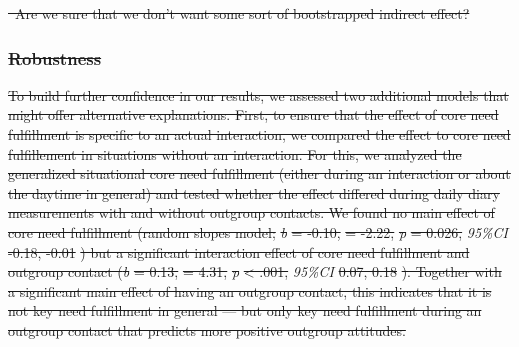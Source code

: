 \documentclass[man, 12pt, a4paper, mask]{apa7} %
\theoremstyle{break}
\theoremstyle{plain}
\providecommand{\DIFdeltex}[1]{{\protect\color{red}\sout{#1}}}                      %
\providecommand{\DIFdelbegin}{} %
\providecommand{\DIFdel}[1]{\texorpdfstring{\DIFdeltex{#1}}{}} %
\newcommand{\DIFscaledelfig}{0.5}
\newlength{\DIFdelgraphicswidth} %
\newlength{\DIFdelgraphicsheight} %
\newcommand{\DIFdelincludegraphics}[2][]{%
\sbox{\DIFdelgraphicsbox}{\DIFOincludegraphics[#1]{#2}}%
\settoboxwidth{\DIFdelgraphicswidth}{\DIFdelgraphicsbox} %
\settoboxtotalheight{\DIFdelgraphicsheight}{\DIFdelgraphicsbox} %
\scalebox{\DIFscaledelfig}{%
\parbox[b]{\DIFdelgraphicswidth}{\usebox{\DIFdelgraphicsbox}\\[-\baselineskip] \rule{\DIFdelgraphicswidth}{0em}}\llap{\resizebox{\DIFdelgraphicswidth}{\DIFdelgraphicsheight}{%
\setlength{\unitlength}{\DIFdelgraphicswidth}%
\begin{picture}(1,1)%
\thicklines\linethickness{2pt} %
{\color[rgb]{1,0,0}\put(0,0){\framebox(1,1){}}}%
{\color[rgb]{1,0,0}\put(0,0){\line( 1,1){1}}}%
{\color[rgb]{1,0,0}\put(0,1){\line(1,-1){1}}}%
\end{picture}%
}\hspace*{3pt}}} %
} %
\DeclareRobustCommand{\DIFdelbegin}{\DIFOdelbegin \let\includegraphics\DIFdelincludegraphics} %
\begin{document}
\DIFdelbegin %
\DIFdel{~Are we sure that we don't want some sort of
bootstrapped indirect effect?
}%

\subsubsection{\DIFdel{Robustness}}
\addtocounter{subsubsection}{-1}%

\DIFdel{To build further confidence in our results, we assessed two additional
models that might offer alternative explanations. First, to ensure that
the effect of core need fulfillment is specific to an actual
interaction, we compared the effect to core need fulfillement in
situations without an interaction. For this, we analyzed the generalized
situational core need fulfillment (either during an interaction or about
the daytime in general) and tested whether the effect differed during
daily diary measurements with and without outgroup contacts. We found no
main effect of core need fulfillment (random slopes model; }\textit{\DIFdel{b}} %
\DIFdel{=
-0.10, }%
\DIFdel{= -2.22, }\textit{\DIFdel{p}} %
\DIFdel{= 0.026,
}\textit{95\%CI}{%
}%
\DIFdel{-0.18, -0.01}%
\DIFdel{) but a significant interaction effect
of core need fulfillment and outgroup contact (}\textit{\DIFdel{b}} %
\DIFdel{= 0.13,
}%
\DIFdel{= 4.31, }\textit{\DIFdel{p}} %
\DIFdel{\textless{} .001,
}\textit{95\%CI}{%
}%
\DIFdel{0.07, 0.18}%
\DIFdel{). Together with a significant main
effect of having an outgroup contact, this indicates that it is not key
need fulfillment in general --- but only key need fulfillment during an
outgroup contact that predicts more positive outgroup attitudes.
}%
\end{document}
